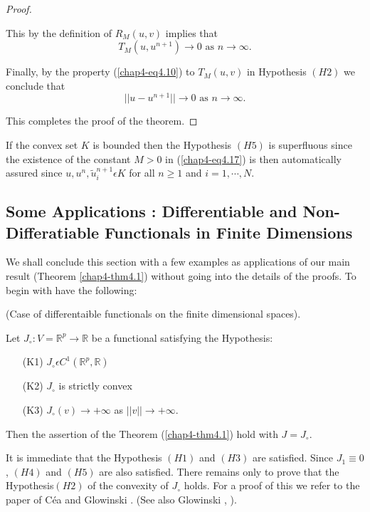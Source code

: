 \begin{proof}
\begin{step}
This by the definition of $R_{M} (u, v)$ implies that
$$
T_{M} (u, u^{n+1}) \to 0 \text{ as } n \to \infty.
$$

Finally, by the property (\ref{chap4-eq4.10}) to $T_{M} (u, v)$ in Hypothesis $(H2)$ we conclude that 
$$
|| u-u^{n+1} || \to 0 \text{ as } n \to \infty.
$$
\end{step}

This completes the proof of the theorem.
\end{proof}

\begin{remark}\label{chap4-rem4.3}
If the convex set $K$ is bounded then the Hypothesis $(H5)$ is superfluous since the existence of the constant $M > 0$ in (\ref{chap4-eq4.17}) is then automatically assured since $u, u^{n}, \widetilde{u}_{i}^{n+1} \epsilon K$ for all $n \geq 1$ and $i = 1, \cdots, N$.
\end{remark}

\subsection{Some Applications : Differentiable and Non-Differatiable Functionals in Finite Dimensions}\label{chap4-subsec4.4}
We shall conclude this section with a few examples as applications of our main result (Theorem \ref{chap4-thm4.1}) without going into the details of the proofs. To begin with have the following:

\begin{theorem}\label{chap4-thm4.2}
(Case of differentaible functionals on the finite dimensional spaces).

Let $J_{\circ} : V = \mathbb{R}^{p} \to \mathbb{R}$ be a functional satisfying the Hypothesis:
\begin{enumerate}
\item[(K1)] $J_{\circ} \epsilon C^{1} (\mathbb{R}^{p}, \mathbb{R})$
\item[(K2)] $J_{\circ}$ is strictly convex
\item[(K3)] $J_{\circ}(v) \to + \infty$ as $|| v || \to + \infty$.
\end{enumerate}
Then the assertion of the Theorem (\ref{chap4-thm4.1}) hold with $J = J_{\circ}$.
\end{theorem}

It is immediate that the Hypothesis $(H1)$ and $(H3)$ are satisfied. Since $J_{1} \equiv 0$, $(H4)$ and $(H5)$ are also satisfied. There remains only to prove that the Hypothesis\pageoriginale $(H2)$ of the convexity of $J_{\circ}$ holds. For a proof of this we refer to the paper of C\'{e}a and Glowinski \cite{key9}. (See also Glowinski \cite{key18}, \cite{key19}).

